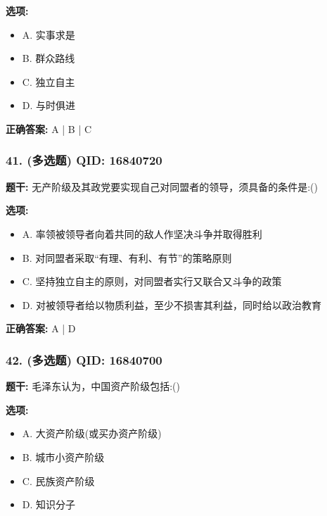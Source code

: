 \documentclass[12pt,UTF8]{ctexart}
\begin{document}
\textbf{选项:}
\begin{itemize}[leftmargin=*]

  \item A. 实事求是

  \item B. 群众路线

  \item C. 独立自主

  \item D. 与时俱进

\end{itemize}

\textbf{正确答案:}
A | B | C

\vspace{0.3em}\hrulefill\vspace{0.7em}

\subsubsection*{41. (多选题) \small QID: 16840720}

\textbf{题干:}
无产阶级及其政党要实现自己对同盟者的领导，须具备的条件是:()

\textbf{选项:}
\begin{itemize}[leftmargin=*]

  \item A. 率领被领导者向着共同的敌人作坚决斗争并取得胜利

  \item B. 对同盟者采取“有理、有利、有节”的策略原则

  \item C. 坚持独立自主的原则，对同盟者实行又联合又斗争的政策

  \item D. 对被领导者给以物质利益，至少不损害其利益，同时给以政治教育

\end{itemize}

\textbf{正确答案:}
A | D

\vspace{0.3em}\hrulefill\vspace{0.7em}

\subsubsection*{42. (多选题) \small QID: 16840700}

\textbf{题干:}
毛泽东认为，中国资产阶级包括:()

\textbf{选项:}
\begin{itemize}[leftmargin=*]

  \item A. 大资产阶级(或买办资产阶级)

  \item B. 城市小资产阶级

  \item C. 民族资产阶级

  \item D. 知识分子

\end{itemize}
\end{document}
